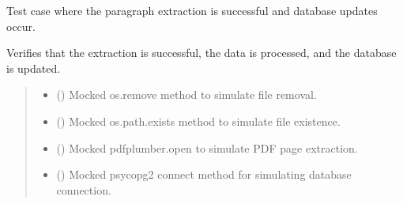 \documentclass[letterpaper,10pt,english]{sphinxmanual}
\begin{document}

\begin{fulllineitems}
\label{\detokenize{test.data_storage:test.data_storage.test_retry_failed_reports.test_successful_extraction}}
\pysigstartsignatures
\pysiglinewithargsret
{}
{\sphinxparamcomma {}\sphinxparamcomma {}\sphinxparamcomma {}\sphinxparamcomma {}\sphinxparamcomma {}\sphinxparamcomma {}}
{}
\pysigstopsignatures
\sphinxAtStartPar
Test case where the paragraph extraction is successful and database updates occur.

\sphinxAtStartPar
Verifies that the extraction is successful, the data is processed, and the database is updated.
\begin{quote}\begin{description}
\begin{itemize}
\item {} 
\sphinxAtStartPar
{} () \textendash{} Mocked os.remove method to simulate file removal.

\item {} 
\sphinxAtStartPar
{} () \textendash{} Mocked os.path.exists method to simulate file existence.

\item {} 
\sphinxAtStartPar
{} () \textendash{} Mocked pdfplumber.open to simulate PDF page extraction.

\item {} 
\sphinxAtStartPar
{} () \textendash{} Mocked psycopg2 connect method for simulating database connection.


\end{itemize}
\end{description}
\end{quote}
\end{fulllineitems}
\end{document}
